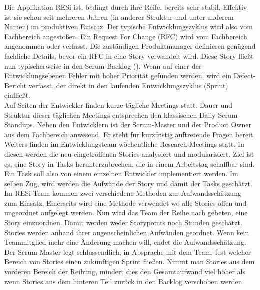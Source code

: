 Die Applikation RESi ist, bedingt durch ihre Reife, bereits sehr stabil. Effektiv ist sie schon seit mehreren Jahren (in anderer Struktur und unter anderem Namen) im produktiven Einsatz. Der typische Entwicklungszyklus wird also vom Fachbereich angestoßen. Ein Request For Change (RFC) wird vom Fachbereich angenommen oder verfasst. Die zuständigen Produktmanager definieren genügend fachliche Details, bevor ein RFC in eine Story verwandelt wird. Diese Story fließt nun typischerweise in den Scrum-Backlog (). Wenn auf einer der Entwicklungsebenen Fehler mit hoher Priorität gefunden werden, wird ein Defect-Bericht verfasst, der direkt in den laufenden Entwicklungszyklus (Sprint) einfließt.\\
Auf Seiten der Entwickler finden kurze tägliche Meetings statt. Dauer und Struktur dieser täglichen Meetings entsprechen den klassischen Daily-Scrum Standups. Neben den Entwicklern ist der Scrum-Master und der Product Owner aus dem Fachbereich anwesend. Er steht für kurzfristig auftretende Fragen bereit. Weiters finden im Entwicklungsteam wöchentliche Research-Meetings statt. In diesen werden die neu eingetroffenen Stories analysiert und modularisiert. Ziel ist es, eine Story in Tasks herunterzubrechen, die in einem Arbeitstag schaffbar sind. Ein Task soll also von einem einzelnen Entwickler implementiert werden. Im selben Zug, wird werden die Aufwände der Story und damit der Tasks geschätzt. Im RESi Team kommen zwei verschiedene Methoden zur Aufwandsschätzung zum Einsatz. Einerseits wird eine Methode verwendet wo alle Stories offen und ungeordnet aufgelegt werden. Nun wird das Team der Reihe nach gebeten, eine Story einzuordnen. Damit werden weder Storypoints noch Stunden geschätzt. Stories werden anhand ihrer augenscheinlichen Aufwänden geordnet. Wenn kein Teammitglied mehr eine Änderung machen will, endet die Aufwandsschätzung. Der Scrum-Master legt schlussendlich, in Absprache mit dem Team, fest welcher Bereich von Stories einen zukünftigen Sprint fließen. Nimmt man Stories aus dem vorderen Bereich der Reihung, mindert dies den Gesamtaufwand viel höher als wenn Stories aus dem hinteren Teil zurück in den Backlog verschoben werden. 

